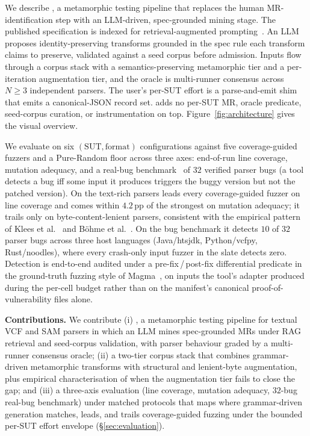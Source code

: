 We describe \biotest{}, a metamorphic testing pipeline that
replaces the human MR-identification step with an LLM-driven,
spec-grounded mining stage. The published specification is
indexed for retrieval-augmented prompting~\citep{lewis2020rag}.
An LLM proposes identity-preserving transforms grounded in the
spec rule each transform claims to preserve, validated against a
seed corpus before admission.
Inputs flow through a corpus stack with a semantics-preserving
metamorphic tier and a per-iteration augmentation tier, and the
oracle is multi-runner consensus across $N{\geq}3$ independent
parsers. The
user's per-SUT effort is a parse-and-emit shim that emits a
canonical-JSON record set. \biotest{} adds no per-SUT MR, oracle
predicate, seed-corpus curation, or instrumentation on top.
Figure~\ref{fig:architecture} gives the visual overview.

We evaluate \biotest{} on six $(\mathrm{SUT, format})$
configurations against five coverage-guided fuzzers and a
Pure-Random floor across three axes: end-of-run line
coverage, mutation adequacy, and a real-bug
benchmark~\citep{hazimeh2020magma} of $32$ verified parser bugs
(a tool detects a bug iff some input it produces triggers the
buggy version but not the patched version). On the text-rich parsers \biotest{} leads every
coverage-guided fuzzer on line coverage and comes within
$4.2$\,pp of the strongest on mutation adequacy; it trails only
on byte-content-lenient parsers, consistent with the empirical
pattern of Klees et al.~\cite{klees2018fuzz} and
B\"ohme et al.~\cite{boehme2020boosting}. On the bug benchmark it detects $10$ of $32$ parser bugs across
three host languages (Java/htsjdk, Python/vcfpy, Rust/noodles),
where every crash-only input fuzzer in the slate detects zero.
Detection is end-to-end audited under a pre-fix\,/\,post-fix
differential predicate in the ground-truth fuzzing style of
Magma~\cite{hazimeh2020magma}, on inputs the tool's adapter
produced during the per-cell budget rather than on the
manifest's canonical proof-of-vulnerability files alone.

\textbf{Contributions.}
We contribute (i) \biotest{}, a metamorphic testing pipeline for
textual VCF and SAM parsers in which an LLM mines spec-grounded
MRs under RAG retrieval and seed-corpus validation, with parser
behaviour graded by a multi-runner consensus oracle;
(ii) a two-tier corpus stack that combines grammar-driven
metamorphic transforms with structural and lenient-byte
augmentation, plus empirical characterisation of when the
augmentation tier fails to close the gap; and (iii) a three-axis
evaluation (line coverage, mutation adequacy, $32$-bug real-bug
benchmark) under matched protocols that maps where grammar-driven
generation matches, leads, and trails coverage-guided fuzzing
under the bounded per-SUT effort envelope (\S\ref{sec:evaluation}).
